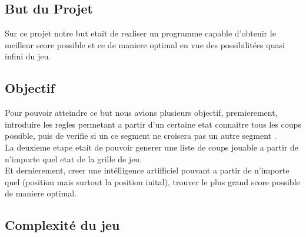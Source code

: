 \documentclass[11pt]{article}
\begin{document}
	\subsection {But du Projet}
		Sur ce projet notre but etait de realiser un programme capable d'obtenir le meilleur score possible et ce de maniere optimal en vue des possibilitées quasi infini du jeu.
	\subsection{Objectif}
Pour pouvoir atteindre ce but nous avions plusieurs objectif, premierement, introduire les regles permetant a partir d'un certaine etat connaitre tous les coups possible, puis de verifie si un ce segment ne croisera pas un autre segment .
\\
La deuxieme etape etait de pouvoir generer une liste de coups jouable a partir de n'importe quel etat de la grille de jeu.
\\
Et dernierement, creer une intélligence artifficiel pouvant a partir de n'importe quel (position mais surtout la position inital), trouver le plus grand score possible de maniere optimal.\\
	\subsection {Complexité du jeu}
\end{document}
